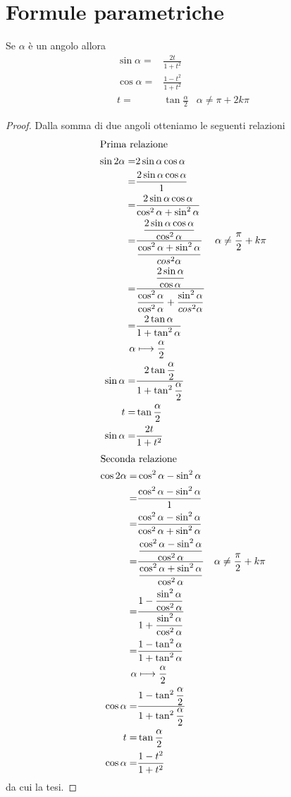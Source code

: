 \section{Formule parametriche}
\begin{thm}\label{thm:formuleparametriche1}
	Se $\alpha$ è un angolo allora
	\begin{align*}
\sin\alpha=&\frac{2t}{1+t^2}\\
\cos\alpha=&\frac{1-t^2}{1+t^2}\\
t=&\tan\frac{\alpha}{2}&\alpha\neq\pi+2k\pi
	\end{align*}
\end{thm}
\begin{proof} Dalla somma di due angoli otteniamo le seguenti relazioni
	\begin{align*}
	\intertext{Prima relazione}
	\sin2\alpha=&2\sin\alpha\cos\alpha\\
	=&\frac{2\sin\alpha\cos\alpha}{1}\\
	=&\frac{2\sin\alpha\cos\alpha}{\cos^2\alpha+\sin^2\alpha}\\
	=&\dfrac{\dfrac{2\sin\alpha\cos\alpha}{\cos^2\alpha}}{\dfrac{\cos^2\alpha+\sin^2\alpha}{cos^2\alpha}}&\alpha\neq\frac{\pi}{2}+k\pi\\
	=&\dfrac{\dfrac{2\sin\alpha}{\cos\alpha}}{\dfrac{\cos^2\alpha}{\cos^2\alpha}+\dfrac{\sin^2\alpha}{cos^2\alpha}}\\
	=&\dfrac{2\tan\alpha}{1+\tan^2\alpha}\\
	\alpha&\longmapsto\dfrac{\alpha}{2}\\
	\sin\alpha=&\dfrac{2\tan\dfrac{\alpha}{2}}{1+\tan^2\dfrac{\alpha}{2}}\\
	t=&\tan\frac{\alpha}{2}\\
	\sin\alpha=&\frac{2t}{1+t^2}\\
	\end{align*}
	\begin{align*}
	\intertext{Seconda relazione}
	\cos 2\alpha=&\cos^2\alpha-\sin^2\alpha\\
	=&\dfrac{\cos^2\alpha-\sin^2\alpha}{1}\\
	=&\frac{\cos^2\alpha-\sin^2\alpha}{\cos^2\alpha+\sin^2\alpha}\\
	=&\frac{\dfrac{\cos^2\alpha-\sin^2\alpha}{\cos^2\alpha}}{\dfrac{\cos^2\alpha+\sin^2\alpha}{\cos^2\alpha}}&\alpha\neq\frac{\pi}{2}+k\pi\\ 
	=&\frac{1-\dfrac{\sin^2\alpha}{\cos^2\alpha}}{1+\dfrac{\sin^2\alpha}{\cos^2\alpha}}\\
	=&\frac{1-\tan^2\alpha}{1+\tan^2\alpha}\\
	\alpha&\longmapsto\dfrac{\alpha}{2}\\
	\cos\alpha=&\frac{1-\tan^2\dfrac{\alpha}{2}}{1+\tan^2\dfrac{\alpha}{2}}\\
	t=&\tan\frac{\alpha}{2}\\
	\cos\alpha=&\frac{1-t^2}{1+t^2}
	\end{align*}
	da cui la tesi.
\end{proof}